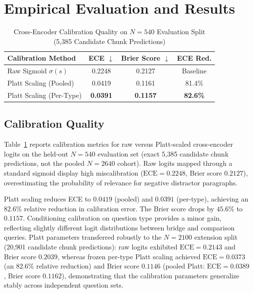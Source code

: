 \documentclass[conference]{IEEEtran}
\begin{document}
\section{Empirical Evaluation and Results}
\label{sec:results}

\begin{table}[t]
\centering
\caption{Cross-Encoder Calibration Quality on $N=540$ Evaluation Split (5,385 Candidate Chunk Predictions)}
\label{tab:calibration}
\begin{tabular}{lccc}
\toprule
\textbf{Calibration Method} & \textbf{ECE} $\downarrow$ & \textbf{Brier Score} $\downarrow$ & \textbf{ECE Red.} \\
\midrule
Raw Sigmoid $\sigma(s)$ & 0.2248 & 0.2127 & Baseline \\
Platt Scaling (Pooled)  & 0.0419 & 0.1161 & 81.4\% \\
Platt Scaling (Per-Type) & \textbf{0.0391} & \textbf{0.1157} & \textbf{82.6\%} \\
\bottomrule
\end{tabular}
\end{table}

\subsection{Calibration Quality}
Table~\ref{tab:calibration} reports calibration metrics for raw versus Platt-scaled cross-encoder logits on the held-out $N=540$ evaluation set (exact 5,385 candidate chunk predictions, not the pooled $N=2640$ cohort). Raw logits mapped through a standard sigmoid display high miscalibration ($\text{ECE}=0.2248$, Brier score $0.2127$), overestimating the probability of relevance for negative distractor paragraphs.

Platt scaling reduces ECE to $0.0419$ (pooled) and $0.0391$ (per-type), achieving an $82.6\%$ relative reduction in calibration error. The Brier score drops by $45.6\%$ to $0.1157$. Conditioning calibration on question type provides a minor gain, reflecting slightly different logit distributions between bridge and comparison queries. Platt parameters transferred robustly to the $N=2100$ extension split (20,901 candidate chunk predictions): raw logits exhibited $\text{ECE}=0.2143$ and Brier score $0.2039$, whereas frozen per-type Platt scaling achieved $\text{ECE}=0.0373$ (an $82.6\%$ relative reduction) and Brier score $0.1146$ (pooled Platt: $\text{ECE}=0.0389$, Brier score $0.1162$), demonstrating that the calibration parameters generalize stably across independent question sets.
\end{document}
